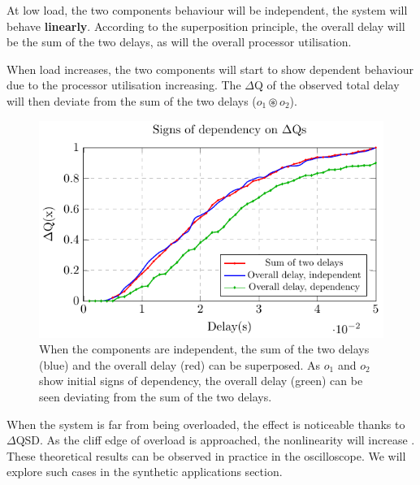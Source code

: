         At low load, the two components behaviour will be independent, the system will behave \textbf{linearly}. According to the superposition principle, the overall delay will be the sum of the two delays, as will the overall processor utilisation. \cite{sup-p}
        
        When load increases, the two components will start to show dependent behaviour due to the processor utilisation increasing. The $\Delta$Q of the observed total delay will then deviate from the sum of the two delays ($o_1 \circledast o_2$). 
        
        \begin{figure}[H]
            \begin{center}
                \includegraphics[scale=1]{tikz/cdf_indep.pdf}
            \end{center}
            \caption{When the components are independent, the sum of the two delays (blue) and the overall delay (red) can be superposed. As $o_1$ and $o_2$ show initial signs of dependency, the overall delay (green) can be seen deviating from the sum of the two delays.}
            \label{fig:cdf_indep}
        \end{figure}

        When the system is far from being overloaded, the effect is noticeable thanks to $\Delta$QSD. As the cliff edge of overload is approached, the nonlinearity will increase \cite{post}. These theoretical results can be observed in practice in the oscilloscope. We will explore such cases in the synthetic applications section.
